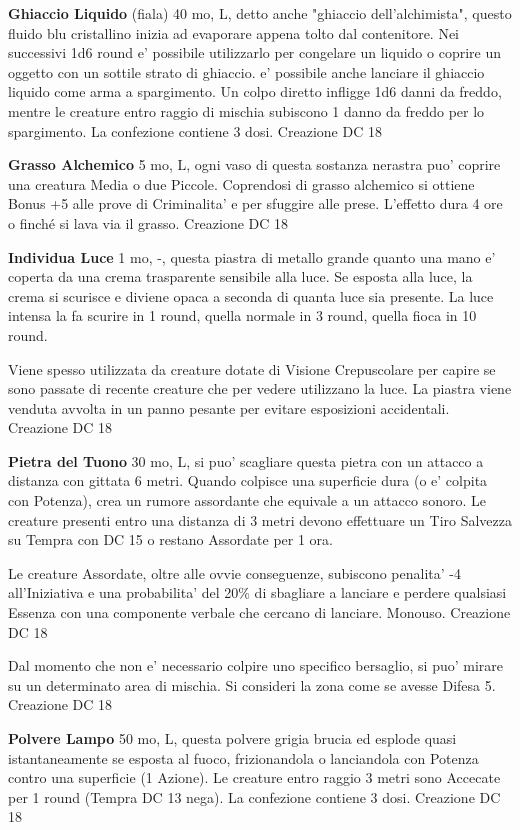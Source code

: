 \documentclass[a4paper,11pt,twoside,openany]{book}
\begin{document}
{\textbf{Ghiaccio Liquido} (fiala) 40 mo, L, detto anche "ghiaccio dell'alchimista", questo fluido blu cristallino inizia ad evaporare appena tolto dal contenitore. Nei successivi 1d6 round e' possibile utilizzarlo per congelare un liquido o coprire un oggetto con un sottile strato di ghiaccio. e' possibile anche lanciare il ghiaccio liquido come arma a spargimento. Un colpo diretto infligge 1d6 danni da freddo, mentre le creature entro raggio di mischia subiscono 1 danno da freddo per lo spargimento. La confezione contiene 3 dosi. Creazione DC 18

\textbf{Grasso Alchemico} 5 mo, L, ogni vaso di questa sostanza nerastra puo' coprire una creatura Media o due Piccole. Coprendosi di grasso alchemico si ottiene Bonus +5 alle prove di Criminalita' e per sfuggire alle prese. L'effetto dura 4 ore o finché si lava via il grasso. Creazione DC 18

\textbf{Individua Luce} 1 mo, -, questa piastra di metallo grande quanto una mano e' coperta da una crema trasparente sensibile alla luce. Se esposta alla luce, la crema si scurisce e diviene opaca a seconda di quanta luce sia presente. La luce intensa la fa scurire in 1 round, quella normale in 3 round, quella fioca in 10 round. 

Viene spesso utilizzata da creature dotate di Visione Crepuscolare per capire se sono passate di recente creature che per vedere utilizzano la luce. La piastra viene venduta avvolta in un panno pesante per evitare esposizioni accidentali. Creazione DC 18

\textbf{Pietra del Tuono} 30 mo, L, si puo' scagliare questa pietra con un attacco a distanza con gittata 6 metri. Quando colpisce una superficie dura (o e' colpita con Potenza), crea un rumore assordante che equivale a un attacco sonoro. Le creature presenti entro una distanza di 3 metri devono effettuare un Tiro Salvezza su Tempra con DC 15 o restano Assordate per 1 ora. 

Le creature Assordate, oltre alle ovvie conseguenze, subiscono penalita' -4 all'Iniziativa e una probabilita' del 20\% di sbagliare a lanciare e perdere qualsiasi Essenza con una componente verbale che cercano di lanciare. Monouso. Creazione DC 18

Dal momento che non e' necessario colpire uno specifico bersaglio, si puo' mirare su un determinato area di mischia. Si consideri la zona come se avesse Difesa 5. Creazione DC 18

\textbf{Polvere Lampo} 50 mo, L, questa polvere grigia brucia ed esplode quasi istantaneamente se esposta al fuoco, frizionandola o lanciandola con Potenza contro una superficie (1 Azione). Le creature entro raggio 3 metri sono Accecate per 1 round (Tempra DC 13 nega). La confezione contiene 3 dosi. Creazione DC 18

}
\end{document}
